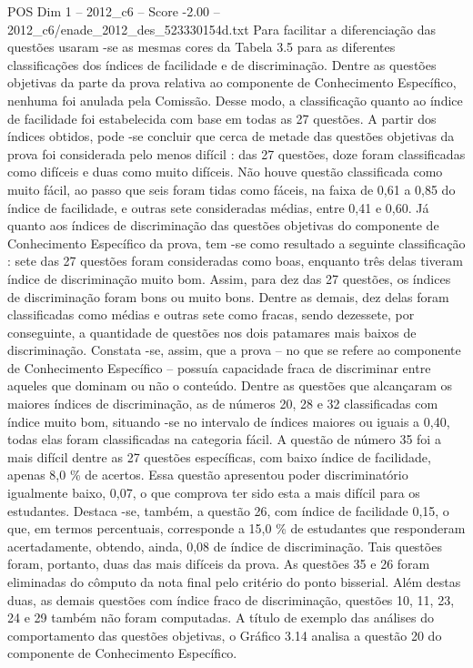 \begin{textsample}{POS Dim 1 – 2012\_c6 – Score -2.00 – 2012\_c6/enade\_2012\_des\_523330154d.txt}
Para facilitar a diferenciação das questões usaram -se as mesmas cores da Tabela 3.5 para as diferentes classificações dos índices de facilidade e de discriminação.
Dentre as questões objetivas da parte da prova relativa ao componente de Conhecimento Específico, nenhuma foi anulada pela Comissão.
Desse modo, a classificação quanto ao índice de facilidade foi estabelecida com base em todas as 27 questões.
A partir dos índices obtidos, pode -se concluir que cerca de metade das questões objetivas da prova foi considerada pelo menos difícil : das 27 questões, doze foram classificadas como difíceis e duas como muito difíceis.
Não houve questão classificada como muito fácil, ao passo que seis foram tidas como fáceis, na faixa de 0,61 a 0,85 do índice de facilidade, e outras sete consideradas médias, entre 0,41 e 0,60.
Já quanto aos índices de discriminação das questões objetivas do componente de Conhecimento Específico da prova, tem -se como resultado a seguinte classificação : sete das 27 questões foram consideradas como boas, enquanto três delas tiveram índice de discriminação muito bom.
Assim, para dez das 27 questões, os índices de discriminação foram bons ou muito bons.
Dentre as demais, dez delas foram classificadas como médias e outras sete como fracas, sendo dezessete, por conseguinte, a quantidade de questões nos dois patamares mais baixos de discriminação.
Constata -se, assim, que a prova – no que se refere ao componente de Conhecimento Específico – possuía capacidade fraca de discriminar entre aqueles que dominam ou não o conteúdo.
Dentre as questões que alcançaram os maiores índices de discriminação, as de números 20, 28 e 32 classificadas com índice muito bom, situando -se no intervalo de índices maiores ou iguais a 0,40, todas elas foram classificadas na categoria fácil.
A questão de número 35 foi a mais difícil dentre as 27 questões específicas, com baixo índice de facilidade, apenas 8,0 \% de acertos.
Essa questão apresentou poder discriminatório igualmente baixo, 0,07, o que comprova ter sido esta a mais difícil para os estudantes.
Destaca -se, também, a questão 26, com índice de facilidade 0,15, o que, em termos percentuais, corresponde a 15,0 \% de estudantes que responderam acertadamente, obtendo, ainda, 0,08 de índice de discriminação.
Tais questões foram, portanto, duas das mais difíceis da prova.
As questões 35 e 26 foram eliminadas do cômputo da nota final pelo critério do ponto bisserial.
Além destas duas, as demais questões com índice fraco de discriminação, questões 10, 11, 23, 24 e 29 também não foram computadas.
A título de exemplo das análises do comportamento das questões objetivas, o Gráfico 3.14 analisa a questão 20 do componente de Conhecimento Específico.

\end{textsample}
